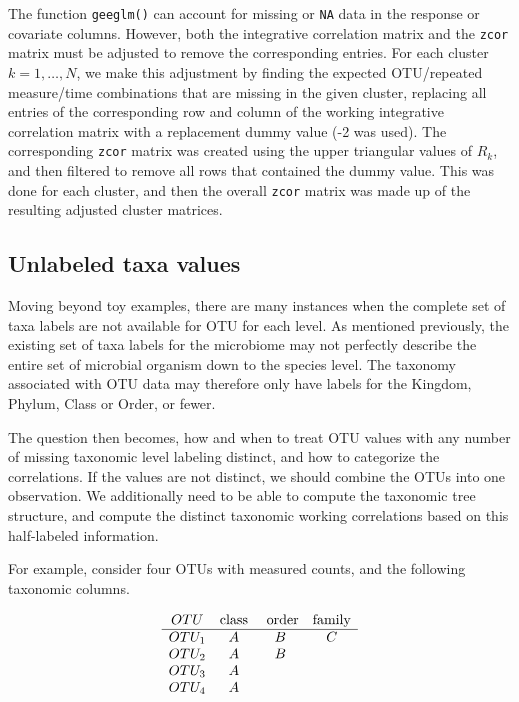 \documentclass[12pt]{article}
\begin{document}
The function \texttt{geeglm()} can account for missing or \texttt{NA} data in the response or covariate columns. However, both the integrative correlation matrix and the \texttt{zcor} matrix must be adjusted to remove the corresponding entries. For each cluster $k = 1, \ldots , N$, we make this adjustment by finding the expected OTU/repeated measure/time combinations that are missing in the given cluster, replacing all entries of the corresponding row and column of the working integrative correlation matrix with a replacement dummy value (-2 was used). The corresponding \texttt{zcor} matrix was created using the upper triangular values of $R_k$, and then filtered to remove all rows that contained the dummy value. This was done for each cluster, and then the overall \texttt{zcor} matrix was made up of the resulting adjusted cluster matrices.


\subsection{Unlabeled taxa values}

Moving beyond toy examples, there are many instances when the complete set of taxa labels are not available for OTU for each level. As mentioned previously, the existing set of taxa labels for the microbiome may not perfectly describe the entire set of microbial organism down to the species level. The taxonomy associated with OTU data may therefore only have labels for the Kingdom, Phylum, Class or Order, or fewer.

The question then becomes, how and when to treat OTU values with any number of missing taxonomic level labeling distinct, and how to categorize the correlations. If the values are not distinct, we should combine the OTUs into one observation. We additionally need to be able to compute the taxonomic tree structure, and compute the distinct taxonomic working correlations based on this half-labeled information.

For example, consider four OTUs with measured counts, and the following taxonomic columns.

$$\begin{array}{c c c c}
  OTU & \text{class} & \text{ order} & \text{family}\\
  \hline
  OTU_1 & A & B & C \\
  OTU_2 & A & B & \\
  OTU_3 & A & & \\
  OTU_4 & A & &
\end{array}
 $$
\end{document}
